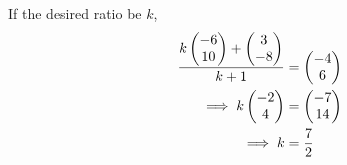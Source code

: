 If the desired ratio be $k$, 
\begin{align}
\frac{k\myvec{-6\\10}+
 \myvec{3\\-8}}{k+1}
&= \myvec{-4\\6}
\\
\implies 
	k\myvec{-2\\4} &= \myvec{-7\\14}
	\\
	\implies k &= \frac{7}{2}
\end{align}
